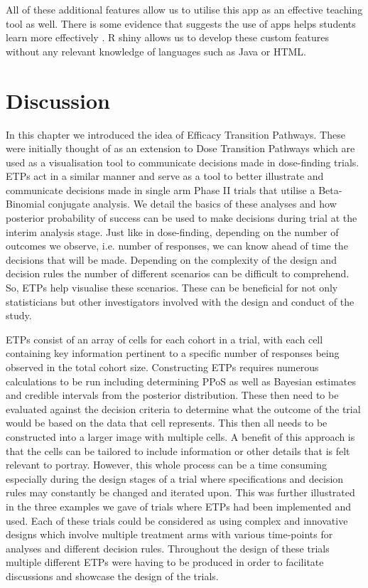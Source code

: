 All of these additional features allow us to utilise this app as an effective teaching tool as well. There is some evidence that suggests the use of apps helps students learn more effectively \cite{doiWebApplicationTeaching2016}. R shiny allows us to develop these custom features without any relevant knowledge of languages such as Java or HTML. 


\section{Discussion}

In this chapter we introduced the idea of Efficacy Transition Pathways. These were initially thought of as an extension to Dose Transition Pathways which are used as a visualisation tool to communicate decisions made in dose-finding trials. ETPs act in a similar manner and serve as a tool to better illustrate and communicate decisions made in single arm Phase \RN{2} trials that utilise a Beta-Binomial conjugate analysis. We detail the basics of these analyses and how posterior probability of success can be used to make decisions during trial at the interim analysis stage. Just like in dose-finding, depending on the number of outcomes we observe, i.e. number of responses, we can know ahead of time the decisions that will be made. Depending on the complexity of the design and decision rules the number of different scenarios can be difficult to comprehend. So, ETPs help visualise these scenarios. These can be beneficial for not only statisticians but other investigators involved with the design and conduct of the study. 

ETPs consist of an array of cells for each cohort in a trial, with each cell containing key information pertinent to a specific number of responses being observed in the total cohort size. Constructing ETPs requires numerous calculations to be run including determining PPoS as well as Bayesian estimates and credible intervals from the posterior distribution. These then need to be evaluated against the decision criteria to determine what the outcome of the trial would be based on the data that cell represents. This then all needs to be constructed into a larger image with multiple cells. A benefit of this approach is that the cells can be tailored to include information or other details that is felt relevant to portray. However, this whole process can be a time consuming  especially during the design stages of a trial where specifications and decision rules may constantly be changed and iterated upon.   This was further illustrated in the three examples we gave of trials where ETPs had been implemented and used. Each of these trials could be considered as using complex and innovative designs which involve multiple treatment arms with various time-points for analyses and different decision rules. Throughout the design of these trials multiple different ETPs were having to be produced in order to facilitate discussions and showcase the design of the trials. 

